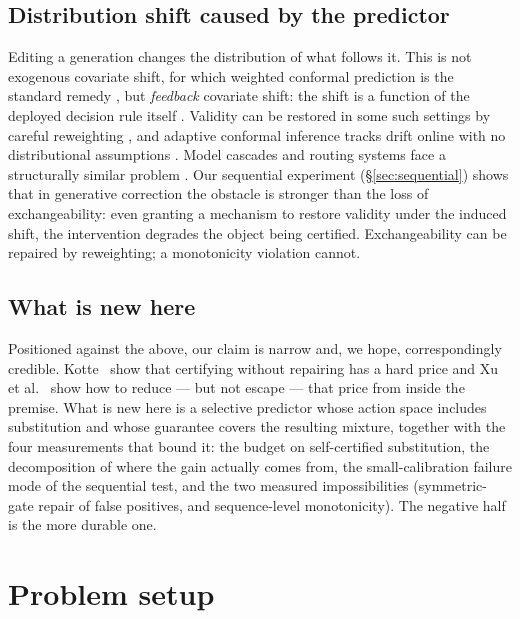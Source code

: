 \documentclass[review,number,doubleblind]{elsarticle}
\theoremstyle{plain}
\theoremstyle{definition}
\theoremstyle{remark}
\begin{document}
\subsection{Distribution shift caused by the predictor}
\label{sec:rel:shift}

Editing a generation changes the distribution of what follows it. This is not exogenous
covariate shift, for which weighted conformal prediction is the standard remedy
\citep{tibshirani2019}, but \emph{feedback} covariate shift: the shift is a function of the
deployed decision rule itself \citep{fannjiang2022fcs}. Validity can be restored in some
such settings by careful reweighting \citep{anydist}, and adaptive conformal inference
tracks drift online with no distributional assumptions \citep{gibbs2021}. Model cascades
and routing systems face a structurally similar problem \citep{chen2023frugalgpt,gupta2024}.
Our sequential experiment (\S\ref{sec:sequential}) shows that in generative correction the
obstacle is stronger than the loss of exchangeability: even granting a mechanism to restore
validity under the induced shift, the intervention degrades the object being certified.
Exchangeability can be repaired by reweighting; a monotonicity violation cannot.

\subsection{What is new here}
\label{sec:rel:summary}

Positioned against the above, our claim is narrow and, we hope, correspondingly credible.
Kotte~\cite{crcimposs} show that certifying without repairing has a hard price and Xu et al.~\cite{bcea}
show how to reduce --- but not escape --- that price from inside the premise. What is new here
is a selective predictor whose action space includes substitution and whose guarantee covers
the resulting mixture, together with the four measurements that bound it: the budget on
self-certified substitution, the decomposition of where the gain actually comes from, the
small-calibration failure mode of the sequential test, and the two measured impossibilities
(symmetric-gate repair of false positives, and sequence-level monotonicity). The negative
half is the more durable one.

\section{Problem setup}
\label{sec:setup}
\end{document}
